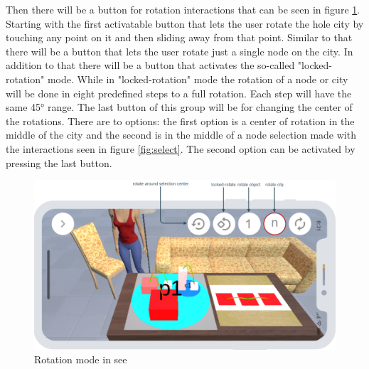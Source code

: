 Then there will be a button for rotation interactions that can be seen in figure \ref{fig:rotate_proto}.
Starting with the first activatable button that lets the user rotate the hole \gls{city} by touching any point on it and then sliding away from that point.
Similar to that there will be a button that lets the user rotate just a single node on the \gls{city}.
In addition to that there will be a button that activates the so-called "locked-rotation" mode.
While in "locked-rotation" mode the rotation of a node or \gls{city} will be done in eight predefined steps to a full rotation.
Each step will have the same 45° range.
The last button of this group will be for changing the center of the rotations. 
There are to options: the first option is a center of rotation in the middle of the \gls{city} and the second is in the middle of a node selection made with the interactions seen in figure \ref{fig:select}.
The second option can be activated by pressing the last button.

\begin{figure}[htb]
    \centering
    \includegraphics[width=1\textwidth]{Concept/img/menu4.png}
    \caption{Rotation mode in \gls{see}}\label{fig:rotate_proto}
\end{figure}

